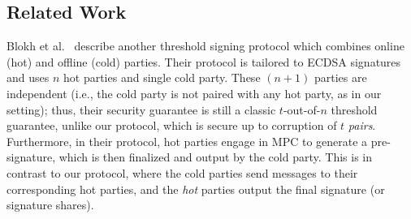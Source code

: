 \subsection{Related Work}

Blokh et al.~\cite{EPRINT:BloMakPel22} describe another threshold signing protocol which combines online (hot) and offline (cold) parties. Their protocol is tailored to ECDSA signatures and uses $n$ hot parties and single cold party. These $(n+1)$ parties are independent (i.e., the cold party is not paired with any hot party, as in our setting); thus, their security guarantee is still a classic $t$-out-of-$n$ threshold guarantee, unlike our protocol, which is secure up to corruption of $t$ \emph{pairs}. Furthermore, in their protocol, hot parties engage in MPC to generate a pre-signature, which is then finalized and output by the cold party. This is in contrast to our protocol, where the cold parties send messages to their corresponding hot parties, and the \emph{hot} parties output the final signature (or signature shares).